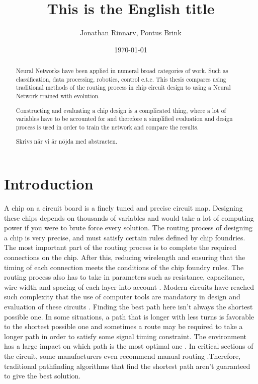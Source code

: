 \documentclass{kththesis}
\title{This is the English title}
\author{Jonathan Rinnarv, Pontus Brink}
\date{\today}
\begin{document}
\frontmatter

\titlepage

\begin{abstract}
Neural Networks have been applied in numeral broad categories of work. Such as classification, data processing, robotics, control e.t.c. This thesis compares using traditional methods of the routing process in chip circuit design to using a Neural Network trained with evolution.

Constructing and evaluating a chip design is a complicated thing, where a lot of variables have to be accounted for and therefore a simplified evaluation and design process is used in order to train the network and compare the results. 
\end{abstract}


\begin{otherlanguage}{swedish}
  \begin{abstract}
   Skrivs när vi är nöjda med abstracten.
  \end{abstract}
\end{otherlanguage}


\tableofcontents


\mainmatter


\chapter{Introduction}

A chip on a circuit board is a finely tuned and precise circuit map. Designing these chips depends on thousands of variables and would take a lot of computing power if you were to brute force every solution. The routing process of designing a chip is very precise, and must satisfy certain rules defined by chip foundries. The most important part of the routing process is to complete the required connections on the chip. After this, reducing wirelength and ensuring that the timing of each connection meets the conditions of the chip foundry rules. The routing process also has to take in parameters such as resistance, capacitance, wire width and spacing of each layer into account \parencite{EDA_routing}. Modern circuits have reached such complexity that the use of computer tools are mandatory in design and evaluation of these circuits \parencite{Digital_Integrated_Circuits}. Finding the best path here isn’t always the shortest possible one. In some situations, a path that is longer with less turns is favorable to the shortest possible one and sometimes a route may be required to take a longer path in order to satisfy some signal timing constraint. The environment has a large impact on which path is the most optimal one \parencite{PCBROUTERS}. In critical sections of the circuit, some manufacturers even recommend manual routing \parencite{NI}.Therefore, traditional pathfinding algorithms that find the shortest path aren’t guaranteed to give the best solution.
\end{document}
